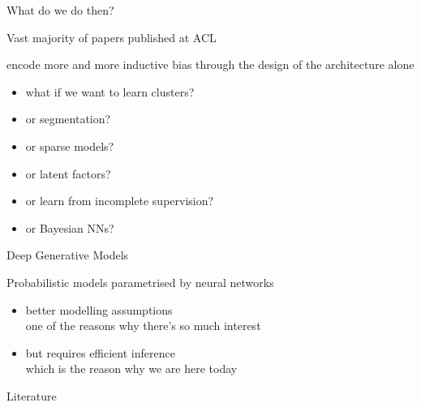 \documentclass[14pt]{beamer}
\begin{document}
\begin{frame}{What do we do then?}

Vast majority of papers published at ACL

\begin{small}
\begin{figure}
\end{figure}
\end{small}
encode more and more inductive bias through the design of the architecture alone
\begin{small}
\begin{multicols}{2}
	\begin{itemize}
		\item what if we want to learn clusters?
		\item or segmentation?
		\item or sparse models?
		\item or latent factors?
		\item or learn from incomplete supervision?
		\item or Bayesian NNs?
	\end{itemize}
\end{multicols}
\end{small}

\end{frame}

\begin{frame}{Deep Generative Models}

Probabilistic models parametrised by neural networks
\begin{itemize}
	\item better modelling assumptions\\
	one of the reasons why there's so much interest	
	\item but requires efficient inference\\
	\alert{which is the reason why we are here today}
\end{itemize}

\end{frame}



\begin{frame}[allowframebreaks]{Literature}

\small

\end{frame}
\end{document}

